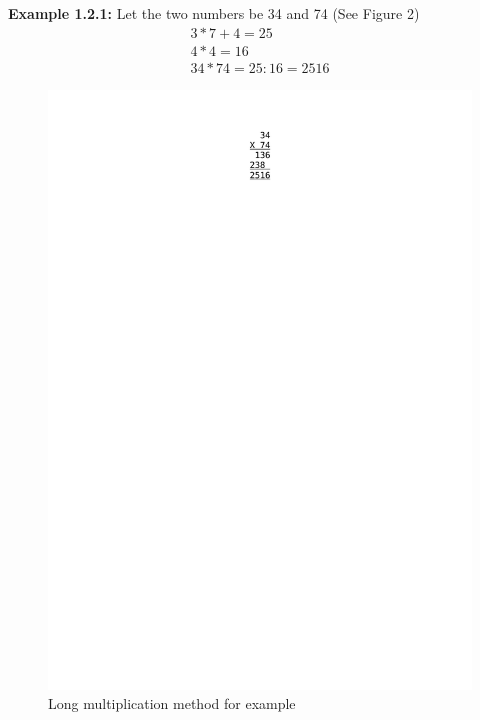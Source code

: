 \documentclass{article}
\begin{document}
        \textbf{Example 1.2.1: } Let the two numbers be 34 and 74 (See Figure 2)
            \begin{align*}
                3*7+4 = 25 \\
                4 * 4 = 16 \\
                34 * 74 = 25:16 = 2516
            \end{align*}
        \begin{figure}[h]
            \includegraphics[trim=67 700 0 60]{example2}
            \caption{Long multiplication method for example}
            \label{fig:example1}
        \end{figure}
        
\end{document}
